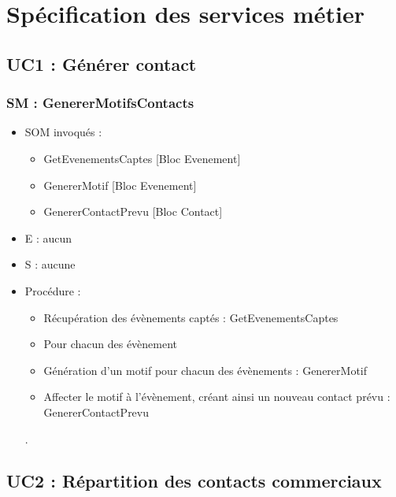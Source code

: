 
\section{Spécification des services métier}
\subsection{UC1 : Générer contact}
\subsubsection{SM : GenererMotifsContacts}
\begin{itemize}
	\item SOM invoqués : 
	\begin{itemize}
		\item GetEvenementsCaptes [Bloc Evenement]
		\item GenererMotif [Bloc Evenement]
		\item GenererContactPrevu [Bloc Contact]
	\end{itemize}
	\item E : aucun
	\item S : aucune
	\item Procédure : 
	\begin{itemize}
		\item Récupération des évènements captés : GetEvenementsCaptes
		\item Pour chacun des évènement
		\item Génération d’un motif pour chacun des évènements : GenererMotif
		\item Affecter le motif à l’évènement, créant ainsi un nouveau contact prévu : GenererContactPrevu
	\end{itemize}.
\end{itemize}



\subsection{UC2 : Répartition des contacts commerciaux}
